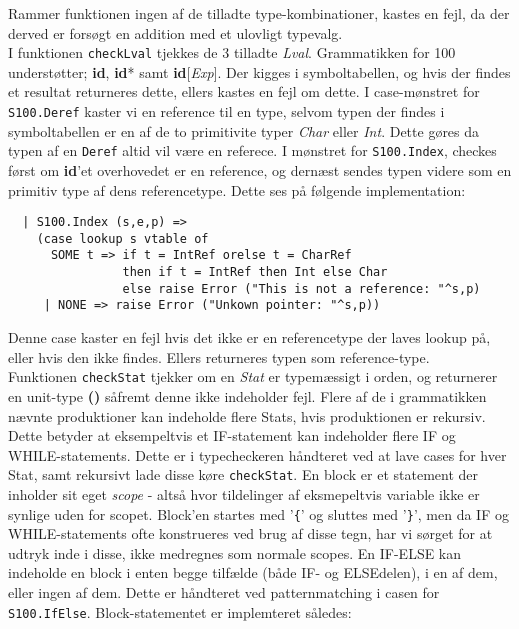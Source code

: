 \documentclass[12pt]{article}
\begin{document}
Rammer funktionen ingen af de tilladte type-kombinationer, kastes en fejl, da der
derved er forsøgt en addition med et ulovligt typevalg. \\

I funktionen \texttt{checkLval} tjekkes de 3 tilladte \textit{Lval}. Grammatikken
for 100 understøtter; \textbf{id}, \textbf{id}* samt \textbf{id}[\textit{Exp}].
Der kigges i symboltabellen, og hvis der findes et resultat returneres
dette, ellers kastes en fejl om dette. I case-mønstret for
\texttt{S100.Deref} kaster vi en reference til en type, selvom typen der
findes i symboltabellen er en af de to primitivite typer \textit{Char} eller
\textit{Int}. Dette gøres da typen af en \texttt{Deref} altid vil være en
referece. I mønstret for \texttt{S100.Index}, checkes først om
\textbf{id}'et overhovedet er en reference, og dernæst sendes typen videre
som en primitiv type af dens referencetype. Dette ses på følgende
implementation: \\

\begin{verbatim}
  | S100.Index (s,e,p) =>
    (case lookup s vtable of
      SOME t => if t = IntRef orelse t = CharRef
                then if t = IntRef then Int else Char
                else raise Error ("This is not a reference: "^s,p)
     | NONE => raise Error ("Unkown pointer: "^s,p))
\end{verbatim}

Denne case kaster en fejl hvis det ikke er en referencetype der laves lookup på, eller hvis den ikke findes. Ellers returneres typen som reference-type.\\

Funktionen \texttt{checkStat} tjekker om en \textit{Stat} er typemæssigt i
orden, og returnerer en unit-type \textbf{()} såfremt denne ikke indeholder
fejl. Flere af de i grammatikken nævnte produktioner kan indeholde flere Stats,
hvis produktionen er rekursiv. Dette betyder at eksempeltvis et IF-statement kan
indeholder flere IF og WHILE-statements. Dette er i typecheckeren håndteret ved
at lave cases for hver Stat, samt rekursivt lade disse køre \texttt{checkStat}.
En block er et statement der inholder sit eget \textit{scope} - altså hvor
tildelinger af eksmepeltvis variable ikke er synlige uden for scopet. Block'en
startes med '\texttt{\{}' og sluttes med '\texttt{\}}', men da IF og
WHILE-statements ofte konstrueres ved brug af disse tegn, har vi sørget for at
udtryk inde i disse, ikke medregnes som normale scopes. En IF-ELSE kan indeholde
en block i enten begge tilfælde (både IF- og ELSEdelen), i en af dem, eller
ingen af dem. Dette er håndteret ved patternmatching i casen for
\texttt{S100.IfElse}. Block-statementet er implemteret således:\\
\end{document}
